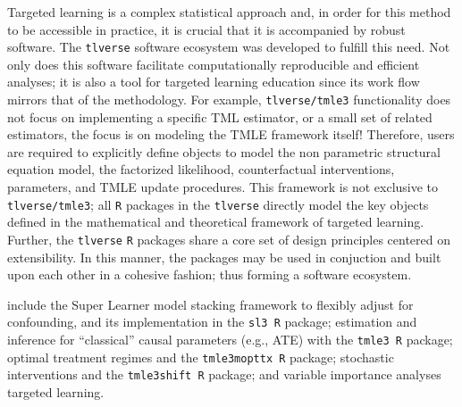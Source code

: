 \documentclass[a4paper,11pt]{texMemo}
\newcommand{\note}[2][]{\added[#1,remark={#2}]{}}
\begin{document}
Targeted learning is a complex statistical approach and, in order for this method to be accessible in practice, it is crucial that it is accompanied by robust software. The \texttt{tlverse} software ecosystem was developed to fulfill this need. Not only does this software facilitate computationally reproducible and efficient analyses; it is also a tool for targeted learning education since its work flow mirrors that of the methodology. For example, \texttt{tlverse/tmle3} functionality does not focus on implementing a specific TML estimator, or a small set of related estimators, the focus is on modeling the TMLE framework itself! Therefore, users are required to explicitly define objects to model the non parametric structural equation model, the factorized likelihood, counterfactual interventions, parameters, and TMLE update procedures. This framework is not exclusive to \texttt{tlverse/tmle3}; all \texttt{R} packages in the \texttt{tlverse} directly model the key objects defined in the mathematical and theoretical framework of targeted learning. Further, the \texttt{tlverse} \texttt{R} packages share a core set of design principles centered on extensibility. In this manner, the packages may be used in conjuction and built upon each other in a cohesive fashion; thus forming a software ecosystem.

\pagebreak

\note[id=RP]{Not sure if we should include the information below that details the topics to be presented. It's not really motivation/rationale and we present it later in the sample schedule}

 include the Super Learner model stacking framework to flexibly adjust for confounding, and its implementation in the \texttt{sl3 R} package; estimation and inference for ``classical'' causal parameters (e.g., ATE) with
the \texttt{tmle3 R} package; optimal treatment regimes and the \texttt{tmle3mopttx R} package; stochastic interventions and the \texttt{tmle3shift R} package; and variable importance analyses   targeted learning.
\end{document}
